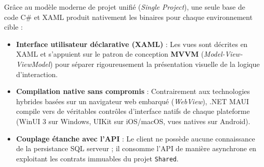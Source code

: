 \documentclass[a4paper,11pt]{report}
\begin{document}
Grâce au modèle moderne de projet unifié (\textit{Single Project}), une seule base de code C\# et XAML produit nativement les binaires pour chaque environnement cible :
\begin{itemize}
    \item \textbf{Interface utilisateur déclarative (XAML)} : Les vues sont décrites en XAML et s'appuient sur le patron de conception \textbf{MVVM} (\textit{Model-View-ViewModel}) pour séparer rigoureusement la présentation visuelle de la logique d'interaction.
    \item \textbf{Compilation native sans compromis} : Contrairement aux technologies hybrides basées sur un navigateur web embarqué (\textit{WebView}), .NET MAUI compile vers de véritables contrôles d'interface natifs de chaque plateforme (WinUI 3 sur Windows, UIKit sur iOS/macOS, vues natives sur Android).
    \item \textbf{Couplage étanche avec l'API} : Le client ne possède aucune connaissance de la persistance SQL serveur ; il consomme l'API de manière asynchrone en exploitant les contrats immuables du projet \texttt{Shared}.
\end{itemize}

\vspace{0.3cm}
\end{document}

